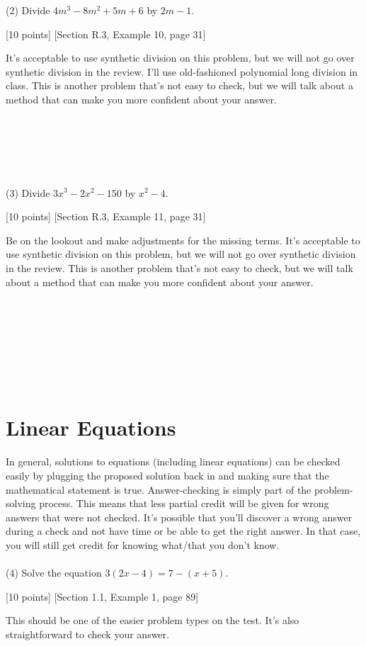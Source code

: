 \documentclass{article}
\begin{document}
(2) Divide $4m^3-8m^2+5m + 6$ by $2m-1$. 


[10 points] [Section R.3, Example 10, page 31]

It's acceptable to use synthetic division on this problem, but we will not go over synthetic division in the review. I'll use old-fashioned polynomial long division in class. This is another problem that's not easy to check, but we will talk about a method that can make you more confident about your answer.\\\\\\\\\\\

(3) Divide $3x^3-2x^2-150$ by $x^2-4$. 


[10 points] [Section R.3, Example 11, page 31]

Be on the lookout and make adjustments for the missing terms. It's acceptable to use synthetic division on this problem, but we will not go over synthetic division in the review. This is another problem that's not easy to check, but we will talk about a method that can make you more confident about your answer.\\\\\\\\\\\\\\\

\section{Linear Equations}
In general, solutions to equations (including linear equations) can be checked easily by plugging the proposed solution back in and making sure that the mathematical statement is true. Answer-checking is simply part of the problem-solving process. This means that less partial credit will be given for wrong answers that were not checked. It's possible that you'll discover a wrong answer during a check and not have time or be able to get the right answer. In that case, you will still get credit for knowing what/that you don't know. \\\\

(4) Solve the equation $3(2x-4) = 7 - (x + 5)$.

[10 points] [Section 1.1, Example 1, page 89]

This should be one of the easier problem types on the test. It's also straightforward to check your answer.\\\\\\\\\\\\\\\
\end{document}
